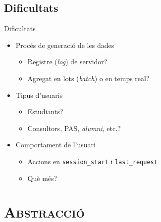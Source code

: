 \documentclass[xcolor=x11names,
								compress,
								aspectratio=1610]{beamer}
\newcommand{\mt}[1]{\texttt{#1}}
\theoremstyle{definition}%
\renewcommand{\(}{\begin{columns}}
\renewcommand{\)}{\end{columns}}
\newcommand{\<}[1]{\begin{column}{#1}}
\renewcommand{\>}{\end{column}}
\begin{document}
\subsection{Dificultats}
\begin{frame}{Dificultats}

\begin{itemize}
	\item Procés de generació de les dades
		\begin{itemize}
		\item Registre (\emph{log}) de servidor?
		\item Agregat en lots (\emph{batch}) o en temps real?
		\end{itemize}
	\item Tipus d'usuaris
		\begin{itemize}
		\item Estudiants?
		\item Consultors, PAS, \emph{alumni}, etc.?
		\end{itemize}
	\item Comportament de l'usuari
		\begin{itemize}
		\item Accions en \mt{session\_start} i \mt{last\_request}
		\item Què més?
		\end{itemize}
\end{itemize}

\end{frame}

\section{\scshape Abstracció}
\end{document}
